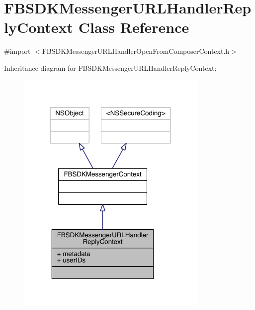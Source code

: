 \hypertarget{interface_f_b_s_d_k_messenger_u_r_l_handler_reply_context}{\section{F\-B\-S\-D\-K\-Messenger\-U\-R\-L\-Handler\-Reply\-Context Class Reference}
\label{interface_f_b_s_d_k_messenger_u_r_l_handler_reply_context}
}


{\ttfamily \#import $<$F\-B\-S\-D\-K\-Messenger\-U\-R\-L\-Handler\-Open\-From\-Composer\-Context.\-h$>$}



Inheritance diagram for F\-B\-S\-D\-K\-Messenger\-U\-R\-L\-Handler\-Reply\-Context\-:
\nopagebreak
\begin{figure}[H]
\begin{center}
\leavevmode
\includegraphics[width=261pt]{interface_f_b_s_d_k_messenger_u_r_l_handler_reply_context__inherit__graph}
\end{center}
\end{figure}


